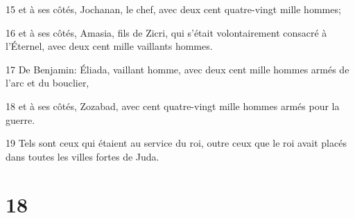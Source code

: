 \par 15 et à ses côtés, Jochanan, le chef, avec deux cent quatre-vingt mille hommes;
\par 16 et à ses côtés, Amasia, fils de Zicri, qui s'était volontairement consacré à l'Éternel, avec deux cent mille vaillants hommes.
\par 17 De Benjamin: Éliada, vaillant homme, avec deux cent mille hommes armés de l'arc et du bouclier,
\par 18 et à ses côtés, Zozabad, avec cent quatre-vingt mille hommes armés pour la guerre.
\par 19 Tels sont ceux qui étaient au service du roi, outre ceux que le roi avait placés dans toutes les villes fortes de Juda.

\chapter{18}

